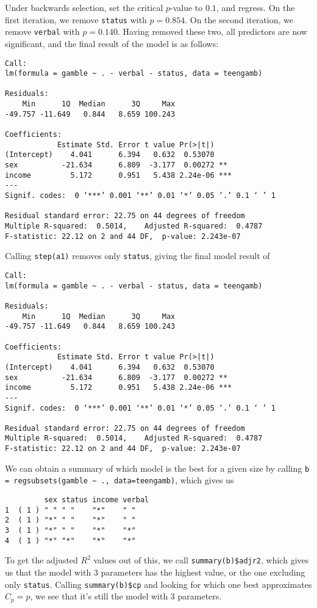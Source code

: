 \documentclass{article}
\begin{document}
%
%
Under backwards selection, set the critical $p$-value to $0.1$, and regress. On the first iteration, we remove \verb|status| with $p=0.854$. On the second iteration, we remove \verb|verbal| with $p=0.140$. Having removed these two, all predictors are now significant, and the final result of the model is as follows:
\begin{verbatim}
Call:
lm(formula = gamble ~ . - verbal - status, data = teengamb)

Residuals:
    Min      1Q  Median      3Q     Max 
-49.757 -11.649   0.844   8.659 100.243 

Coefficients:
            Estimate Std. Error t value Pr(>|t|)    
(Intercept)    4.041      6.394   0.632  0.53070    
sex          -21.634      6.809  -3.177  0.00272 ** 
income         5.172      0.951   5.438 2.24e-06 ***
---
Signif. codes:  0 ‘***’ 0.001 ‘**’ 0.01 ‘*’ 0.05 ‘.’ 0.1 ‘ ’ 1

Residual standard error: 22.75 on 44 degrees of freedom
Multiple R-squared:  0.5014,    Adjusted R-squared:  0.4787 
F-statistic: 22.12 on 2 and 44 DF,  p-value: 2.243e-07
\end{verbatim}
Calling \verb|step(a1)| removes only \verb|status|, giving the final model result of
\begin{verbatim}
Call:
lm(formula = gamble ~ . - verbal - status, data = teengamb)

Residuals:
    Min      1Q  Median      3Q     Max 
-49.757 -11.649   0.844   8.659 100.243 

Coefficients:
            Estimate Std. Error t value Pr(>|t|)    
(Intercept)    4.041      6.394   0.632  0.53070    
sex          -21.634      6.809  -3.177  0.00272 ** 
income         5.172      0.951   5.438 2.24e-06 ***
---
Signif. codes:  0 ‘***’ 0.001 ‘**’ 0.01 ‘*’ 0.05 ‘.’ 0.1 ‘ ’ 1

Residual standard error: 22.75 on 44 degrees of freedom
Multiple R-squared:  0.5014,    Adjusted R-squared:  0.4787 
F-statistic: 22.12 on 2 and 44 DF,  p-value: 2.243e-07
\end{verbatim}
We can obtain a summary of which model is the best for a given size by calling \verb|b = regsubsets(gamble ~ ., data=teengamb)|, which gives us
\begin{verbatim}
         sex status income verbal
1  ( 1 ) " " " "    "*"    " "   
2  ( 1 ) "*" " "    "*"    " "   
3  ( 1 ) "*" " "    "*"    "*"   
4  ( 1 ) "*" "*"    "*"    "*" 
\end{verbatim}
To get the adjusted $R^2$ values out of this, we call \verb|summary(b)$adjr2|, which gives us that the model with $3$ parameters has the highest value, or the one excluding only \verb|status|.
Calling \verb|summary(b)$cp| and looking for which one best approximates $C_p=p$, we see that it's still the model with $3$ parameters.
\end{document}
